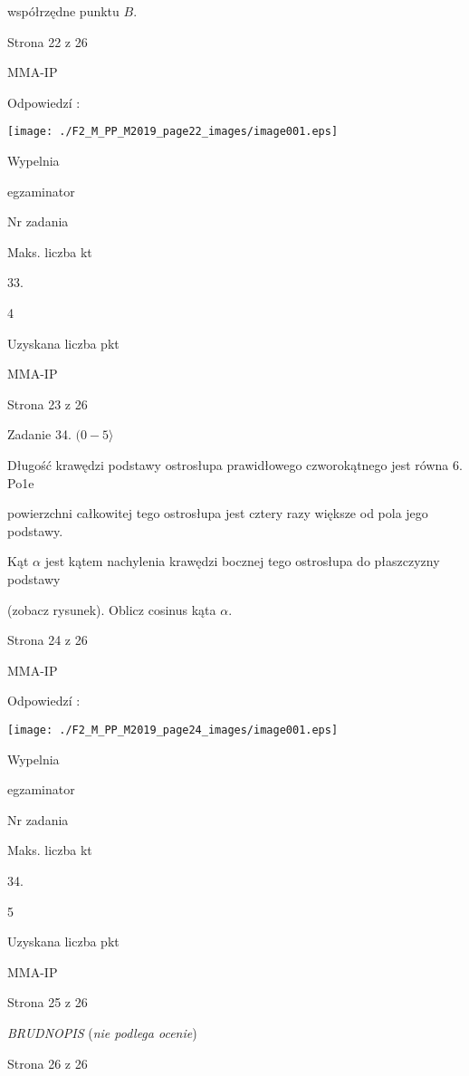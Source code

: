 \documentclass[a4paper,12pt]{article}
\begin{document}
współrzędne punktu $B.$

Strona 22 z 26

MMA-IP





Odpowiedzí :
\begin{center}
\texttt{[image: ./F2\_M\_PP\_M2019\_page22\_images/image001.eps]}
\end{center}
Wypelnia

egzaminator

Nr zadania

Maks. liczba kt

33.

4

Uzyskana liczba pkt

MMA-IP

Strona 23 z 26





Zadanie 34. $(0-5\rangle$

Długość krawędzi podstawy ostrosłupa prawidłowego czworokątnego jest równa 6. Po1e

powierzchni całkowitej tego ostrosłupa jest cztery razy większe od pola jego podstawy.

Kąt $\alpha$ jest kątem nachylenia krawędzi bocznej tego ostrosłupa do płaszczyzny podstawy

(zobacz rysunek). Oblicz cosinus kąta $\alpha.$

Strona 24 z 26

MMA-IP





Odpowiedzí :
\begin{center}
\texttt{[image: ./F2\_M\_PP\_M2019\_page24\_images/image001.eps]}
\end{center}
Wypelnia

egzaminator

Nr zadania

Maks. liczba kt

34.

5

Uzyskana liczba pkt

MMA-IP

Strona 25 z 26





{\it BRUDNOPIS} ({\it nie podlega ocenie})

Strona 26 z 26
\end{document}

